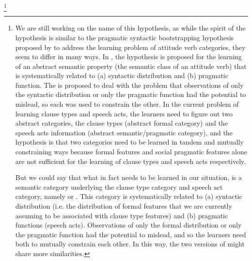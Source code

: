 
\footnote{We are still working on the name of this hypothesis, as while the spirit of the hypothesis is similar to the pragmatic syntactic bootstrapping hypothesis proposed by \textcite{hacquardlidz2018} to address the learning problem of attitude verb categories, they seem to differ in many ways. In \textcite{hacquardlidz2018}, the hypothesis is proposed for the learning of an abstract semantic property (the semantic class of an attitude verb) that is systematically related to (a) syntactic distribution and (b) pragmatic function. The \hypos{} is proposed to deal with the problem that observations of only the syntactic distribution or only the pragmatic function had the potential to mislead, so each was used to constrain the other. In the current problem of learning clause types and speech acts, the learners need to figure out two abstract categories, the clause types (abstract formal category) and the speech acts information (abstract semantic/pragmatic category), and the hypothesis is that two categories need to be learned in tandem and mutually constraining ways because formal features and social pragmatic features alone are not sufficient for the learning of clause types and speech acts respectively. 

But we could say that what in fact needs to be learned in our situation, is a semantic category underlying the clause type category and speech act category, namely  or . This category is systematically related to (a) syntactic distribution (i.e. the distribution of formal features that we are currently assuming to be associated with clause type features) and (b) pragmatic functions (speech acts). Observations of only the formal distribution or only the pragmatic function had the potential to mislead, and so the learners need both to mutually constrain each other. In this way, the two versions of \hypos{} might share more similarities.

}
